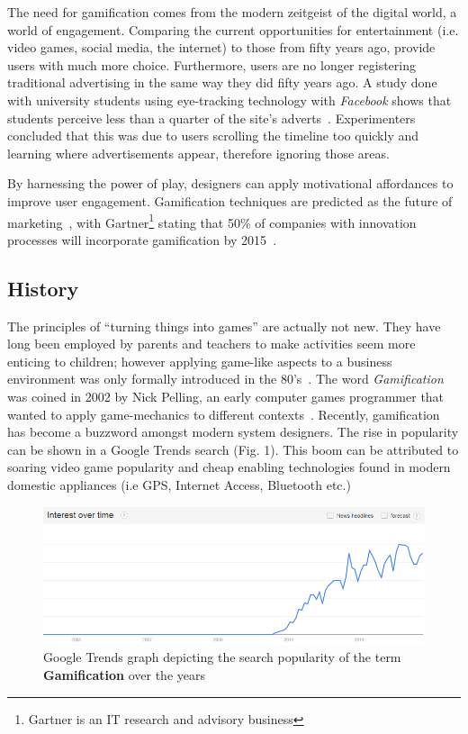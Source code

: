 The need for gamification comes from the modern zeitgeist of the digital world, a world of engagement. Comparing the current opportunities for entertainment (i.e. video games, social media, the internet) to those from fifty years ago, provide users with much more choice. Furthermore, users are no longer registering traditional advertising in the same way they did fifty years ago. A study done with university students using eye-tracking technology with \emph{Facebook} shows that students perceive less than a quarter of the site's adverts~\cite{barreto2013users}. Experimenters concluded that this was due to users scrolling the timeline too quickly and learning where advertisements appear, therefore ignoring those areas. 

By harnessing the power of play, designers can apply motivational affordances to improve user engagement. Gamification techniques are predicted as the future of marketing~\cite{6758978}, with Gartner\footnote{Gartner is an IT research and advisory business} stating that 50\% of companies with innovation processes will incorporate gamification by 2015~\cite{gartner50}.

\subsection{History}
The principles of ``turning things into games'' are actually not new. They have long been employed by parents and teachers to make activities seem more enticing to children; however applying game-like aspects to a business environment was only formally introduced in the 80's~\cite{coonradt1985game}. The word \emph{Gamification} was coined in 2002 by Nick Pelling, an early computer games programmer that wanted to apply game-mechanics to different contexts~\cite{marczewskigamification}. Recently, gamification has become a buzzword amongst modern system designers. The rise in popularity can be shown in a Google Trends search (Fig. 1). This boom can be attributed to soaring video game popularity and cheap enabling technologies found in modern domestic appliances (i.e GPS, Internet Access, Bluetooth etc.)~\cite{Deterding:2012:GDM:2212877.2212883}

\begin{figure}[H]
  \centering
    \includegraphics[width=1\textwidth]{img/gamification.png}
      \caption{Google Trends graph depicting the search popularity of the term \textbf{Gamification} over the years}
\end{figure}


